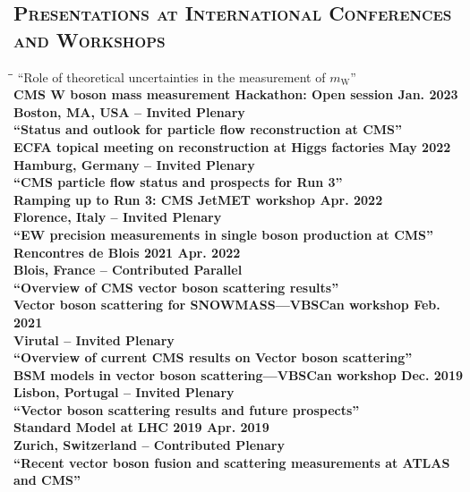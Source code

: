 \documentclass[10pt]{res} %
\begin{document}
\begin{resume}
\section{\textsc{Presentations at International Conferences and Workshops}}
\vspace{-0.1in}
\begin{tabbing}
\hspace{2.3in}\= \hspace{2.6in}\= \kill %
``Role of theoretical uncertainties in the measurement of $m_{\mathrm{W}}$'' \\
\bf{CMS W boson mass measurement Hackathon: Open session} 		 \> \>	    Jan. 2023 \\
Boston, MA, USA -- Invited Plenary \\
``Status and outlook for particle flow reconstruction at CMS'' \\
\bf{ECFA topical meeting on reconstruction at Higgs factories} 		 \> \>	    May 2022 \\
Hamburg, Germany -- Invited Plenary\\
``CMS particle flow status and prospects for Run 3'' \\
\bf{Ramping up to Run 3: CMS JetMET workshop} 		 \> \>	    Apr. 2022 \\
Florence, Italy -- Invited Plenary\\
``EW precision measurements in single boson production at CMS'' \\
\bf{Rencontres de Blois 2021} 		 \> \>	    Apr. 2022 \\
Blois, France -- Contributed Parallel\\
``Overview of CMS vector boson scattering results'' \\
\bf{Vector boson scattering for SNOWMASS---VBSCan workshop} 		 \> \>	    Feb. 2021 \\
Virutal -- Invited Plenary\\
``Overview of current CMS results on Vector boson scattering'' \\
\bf{BSM models in vector boson scattering---VBSCan workshop} 		 \> \>	    Dec. 2019 \\
Lisbon, Portugal -- Invited Plenary\\
``Vector boson scattering results and future prospects'' \\
\bf{Standard Model at LHC 2019} 		 \> \>	    Apr. 2019 \\
Zurich, Switzerland -- Contributed Plenary \\
``Recent vector boson fusion and scattering measurements at ATLAS and CMS'' \\

\end{tabbing}
\end{resume}
\end{document}
